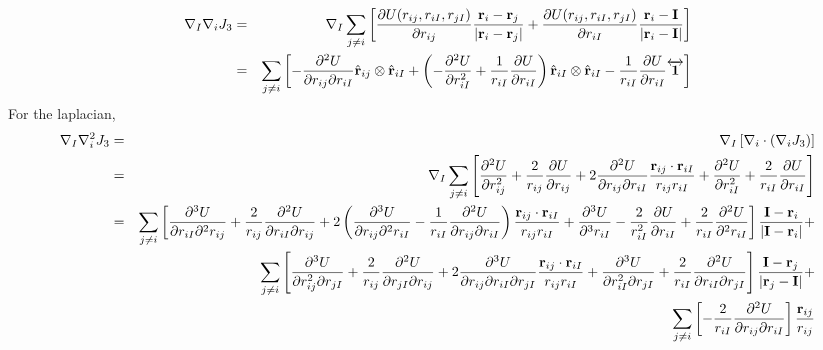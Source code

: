 \begin{eqnarray}
\nabla_I \nabla_i J_3 & = & \nabla_I \sum_{j \neq i}
\left[\frac{\partial U(r_{ij}, r_{iI},r_{jI})}{\partial r_{ij}}
  \frac{\mathbf{r}_i - \mathbf{r}_j}{|\mathbf{r}_i - \mathbf{r}_j|} 
+ \frac{\partial U(r_{ij}, r_{iI},r_{jI})}{\partial r_{iI}}
  \frac{\mathbf{r}_i - \mathbf{I}}{|\mathbf{r}_i - \mathbf{I}|}  \right] \\\nonumber 
& = & \sum_{j\neq i} \left[ -\frac{\partial^2 U}{\partial r_{ij} \partial r_{iI}} \hat{\mathbf{r}}_{ij} \otimes \hat{\mathbf{r}}_{iI} +
\left(-\frac{\partial^2 U}{\partial r_{iI}^2}  + \frac{1}{r_{iI}}\frac{\partial U}{\partial r_{iI}} \right) 
\hat{\mathbf{r}}_{iI} \otimes \hat{\mathbf{r}}_{iI} - \frac{1}{r_{iI}}\frac{\partial U}{\partial r_{iI}} \overleftrightarrow{\mathbf{1}}
\right]
\end{eqnarray}
For the laplacian,
\begin{eqnarray}
\nabla_I \nabla_i^2 J_3 & = & \nabla_I\left[\nabla_i \cdot \left(\nabla_i J_3\right)\right] \\
& = & \nabla_I \sum_{j\neq i } \left[
\frac{\partial^2 U}{\partial r_{ij}^2} + \frac{2}{r_{ij}} \frac{\partial
  U}{\partial r_{ij}} + 2 \frac{\partial^2 U}{\partial r_{ij} \partial
  r_{iI}}\frac{\mathbf{r}_{ij}\cdot\mathbf{r}_{iI}}{r_{ij}r_{iI}} +\frac{\partial^2 U}{\partial
  r_{iI}^2}
+ \frac{2}{r_{iI}}\frac{\partial U}{\partial r_{iI}} \nonumber
\right] \\
& = & \sum_{j\neq i } 
\left[ \frac{\partial^3 U}{\partial r_{iI} \partial^2 r_{ij}} +
\frac{2}{r_{ij}} \frac{\partial^2 U}{\partial r_{iI} \partial r_{ij}}
+ 2\left(\frac{\partial^3 U}{\partial r_{ij} \partial^2 r_{iI}} -\frac{1}{r_{iI}} \frac{\partial^2 U}{\partial r_{ij} \partial r_{iI}}\right)\frac{\mathbf{r}_{ij}\cdot\mathbf{r}_{iI}}{r_{ij}r_{iI}} + \frac{\partial^3 U}{\partial^3 r_{iI}} - \frac{2}{r_{iI}^2} \frac{\partial U}{ \partial r_{iI}} + \frac{2}{r_{iI}} \frac{\partial^2 U}{\partial^2 r_{iI}}
\right] \frac{\mathbf{I} - \mathbf{r}_i}{|\mathbf{I} - \mathbf{r}_i|} + \nonumber \\\nonumber 
 & & \sum_{j\neq i } \left[ \frac{\partial^3U}{\partial r_{ij}^2 \partial r_{jI}} + \frac{2}{r_{ij}}\frac{\partial^2 U}{\partial r_{jI} \partial r_{ij}} 
+ 2\frac{\partial^3 U}{\partial r_{ij} \partial r_{iI} \partial r_{jI}}\frac{\mathbf{r}_{ij}\cdot\mathbf{r}_{iI}}{r_{ij}r_{iI}}
+\frac{\partial^3 U}{\partial r_{iI}^2 \partial r_{jI}} + \frac{2}{r_{iI}}\frac{\partial^2 U}{\partial r_{iI} \partial r_{jI}} \right] 
\frac{\mathbf{I} - \mathbf{r}_j}{|\mathbf{r}_j - \mathbf{I}|} + \\\nonumber 
& & \sum_{j\neq i } \left[ -\frac{2}{r_{iI}}\frac{\partial^2 U}{\partial r_{ij} \partial r_{iI}}\right] \frac{\mathbf{r}_{ij}}{r_{ij}}
\end{eqnarray}




